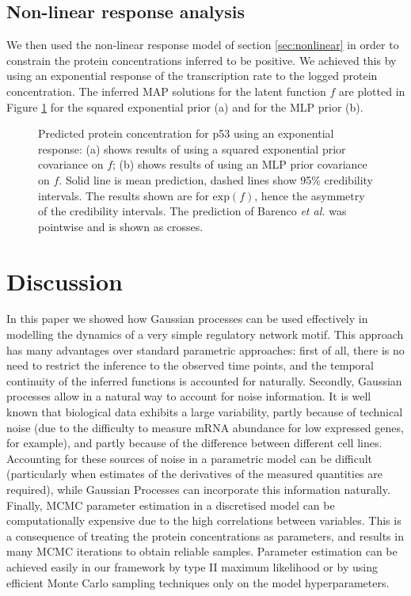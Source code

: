\documentclass[english]{article}
\begin{document}
\subsection{Non-linear response analysis}
We then used the non-linear response model of section \ref{sec:nonlinear} in 
order to constrain the protein concentrations inferred to be positive. We 
achieved this by using an exponential response of the transcription rate to 
the logged protein concentration. 
The inferred MAP solutions for the latent function $f$ are plotted in Figure
\ref{nonlinearInf} for the squared exponential prior (a) and for the MLP prior
(b).

%
\begin{figure}[ht]\vspace{-0.4cm}
\begin{center}
\end{center}\vspace{-0.4cm}
\caption{\small Predicted protein concentration for p53 using an exponential response:
(a) shows results of using a squared exponential prior covariance on $f$; (b) 
shows results of using an MLP prior covariance on $f$.
Solid line is mean 
prediction, dashed
lines show 95\% credibility intervals. The results shown are for 
$\textrm{exp}(f)$, hence the asymmetry of the credibility intervals. 
The prediction of Barenco \emph{et al.} was pointwise and is shown as crosses.}
\label{nonlinearInf}\vspace{-0.3cm}
\end{figure}%
\section{Discussion}
In this paper we showed how Gaussian processes can be used effectively in 
modelling the dynamics of a very simple regulatory network motif. 
This approach has many advantages over standard parametric approaches: first of
all, there is no need to restrict the inference to the observed time points, 
and the temporal
continuity of the inferred functions is accounted for naturally. Secondly,
Gaussian processes allow in a natural way to account for noise information.
It is well known that biological data exhibits a large variability, partly
because of technical noise (due to the difficulty to measure mRNA abundance for
low expressed genes, for example), and partly because of the difference
between different cell lines. Accounting for these sources of noise in a 
parametric model can be difficult (particularly when estimates of the 
derivatives of the measured quantities are required), while Gaussian
Processes can incorporate this information naturally. Finally, MCMC parameter
estimation in a discretised model can be computationally expensive 
due to the high correlations
between variables. This is a consequence of treating the protein concentrations
as parameters, and results in many MCMC iterations to obtain reliable samples.
Parameter estimation can be achieved easily in our framework by type II maximum
likelihood or by using efficient Monte Carlo sampling techniques only on
the model hyperparameters.
\end{document}
